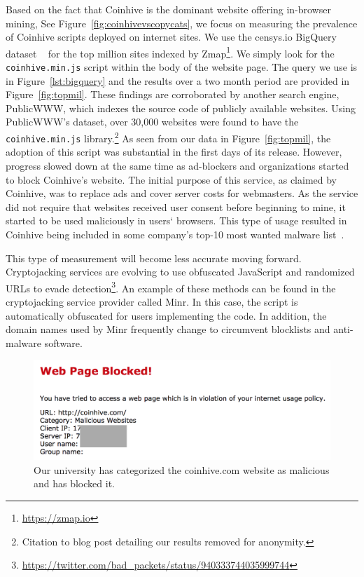 Based on the fact that Coinhive is the dominant website offering in-browser mining, See Figure~\ref{fig:coinhivevscopycats}, we focus on measuring the prevalence of Coinhive scripts deployed on internet sites. We use the censys.io BigQuery dataset ~\cite{censys15} for the top million sites indexed by Zmap\footnote{\url{https://zmap.io}}. We simply look for the \texttt{coinhive.min.js} script within the body of the website page. The query we use is in Figure~\ref{lst:bigquery} and the results over a two month period are provided in Figure~\ref{fig:topmil}. These findings are corroborated by another search engine, PublicWWW, which indexes the source code of publicly available websites. Using PublicWWW's dataset, over 30,000 websites were found to have the \texttt{coinhive.min.js} library.\footnote{Citation to blog post detailing our results removed for anonymity.} As seen from our data in Figure~\ref{fig:topmil}, the adoption of this script was substantial in the first days of its release. However, progress slowed down at the same time as ad-blockers and organizations started to block Coinhive's website. The initial purpose of this service, as claimed by Coinhive, was to replace ads and cover server costs for webmasters. As the service did not require that websites received user consent before beginning to mine, it started to be used maliciously in users` browsers. This type of usage resulted in Coinhive being included in some company's top-10 most wanted malware list~\cite{checkpoint}.


This type of measurement will become less accurate moving forward. Cryptojacking services are evolving to use obfuscated JavaScript and randomized URLs to evade detection\footnote{\url{https://twitter.com/bad_packets/status/940333744035999744}}. An example of these methods can be found in the cryptojacking service provider called Minr. In this case, the script is automatically obfuscated for users implementing the code. In addition, the domain names used by Minr frequently change to circumvent blocklists and anti-malware software.

\begin{figure}[t]
\centering
\includegraphics[width=0.9\linewidth]{figures/coinhive_blocked.png}
\caption{Our university has categorized the coinhive.com website as malicious and has blocked it.\label{fig:concordia}}
\end{figure}

